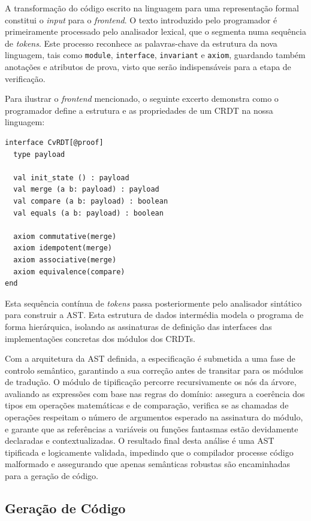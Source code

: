 \documentclass{llncs}
\begin{document}
A transformação do código escrito na linguagem para uma representação formal constitui o \textit{input} para o \textit{frontend}.
O texto introduzido pelo programador é primeiramente processado pelo analisador lexical, que o segmenta numa sequência de \textit{tokens}.
Este processo reconhece as palavras-chave da estrutura da nova linguagem, tais como \texttt{module}, \texttt{interface}, \texttt{invariant} e \texttt{axiom},
guardando também anotações e atributos de prova, visto que serão indispensáveis para a etapa de verificação.

Para ilustrar o \textit{frontend} mencionado, o seguinte excerto demonstra como o programador define a estrutura e as propriedades de um CRDT na nossa linguagem:

\begin{verbatim}
interface CvRDT[@proof]
  type payload

  val init_state () : payload
  val merge (a b: payload) : payload
  val compare (a b: payload) : boolean
  val equals (a b: payload) : boolean

  axiom commutative(merge)
  axiom idempotent(merge)
  axiom associative(merge)
  axiom equivalence(compare)
end
\end{verbatim}

Esta sequência contínua de \textit{tokens} passa posteriormente pelo analisador sintático para construir a AST.
Esta estrutura de dados intermédia modela o programa de forma hierárquica,
isolando as assinaturas de definição das interfaces das implementações concretas dos módulos dos CRDTs.

Com a arquitetura da AST definida, a especificação é submetida a uma fase de controlo semântico,
garantindo a sua correção antes de transitar para os módulos de tradução. O módulo de tipificação percorre recursivamente os nós da árvore,
avaliando as expressões com base nas regras do domínio: assegura a coerência dos tipos em operações matemáticas e de comparação,
verifica se as chamadas de operações respeitam o número de argumentos esperado na assinatura do módulo,
e garante que as referências a variáveis ou funções fantasmas estão devidamente declaradas e contextualizadas.
O resultado final desta análise é uma AST tipificada e logicamente validada,
impedindo que o compilador processe código malformado e assegurando que apenas semânticas robustas são encaminhadas para a geração de código.

\subsection{Geração de Código}
\end{document}
